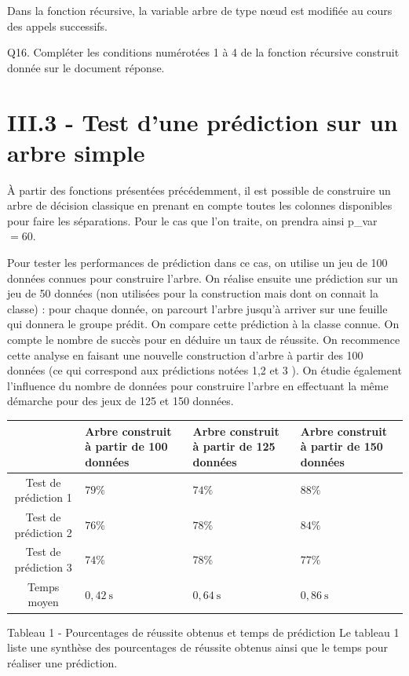 \documentclass[10pt]{article}
\begin{document}
Dans la fonction récursive, la variable arbre de type nœud est modifiée au cours des appels successifs.

Q16. Compléter les conditions numérotées 1 à 4 de la fonction récursive construit donnée sur le document réponse.

\section{III.3 - Test d'une prédiction sur un arbre simple}
À partir des fonctions présentées précédemment, il est possible de construire un arbre de décision classique en prenant en compte toutes les colonnes disponibles pour faire les séparations. Pour le cas que l'on traite, on prendra ainsi p\_var $=60$.

Pour tester les performances de prédiction dans ce cas, on utilise un jeu de 100 données connues pour construire l'arbre. On réalise ensuite une prédiction sur un jeu de 50 données (non utilisées pour la construction mais dont on connait la classe) : pour chaque donnée, on parcourt l'arbre jusqu'à arriver sur une feuille qui donnera le groupe prédit. On compare cette prédiction à la classe connue. On compte le nombre de succès pour en déduire un taux de réussite. On recommence cette analyse en faisant une nouvelle construction d'arbre à partir des 100 données (ce qui correspond aux prédictions notées 1,2 et 3 ). On étudie également l'influence du nombre de données pour construire l'arbre en effectuant la même démarche pour des jeux de 125 et 150 données.

\begin{tabular}{|c|l|l|l|}
\hline
 & Arbre construit à partir de 100 données & Arbre construit à partir de 125 données & Arbre construit à partir de 150 données \\
\hline
Test de prédiction 1 & $79 \%$ & $74 \%$ & $88 \%$ \\
\hline
Test de prédiction 2 & $76 \%$ & $78 \%$ & $84 \%$ \\
\hline
Test de prédiction 3 & $74 \%$ & $78 \%$ & $77 \%$ \\
\hline
Temps moyen & $0,42 \mathrm{~s}$ & $0,64 \mathrm{~s}$ & $0,86 \mathrm{~s}$ \\
\hline
\end{tabular}

Tableau 1 - Pourcentages de réussite obtenus et temps de prédiction Le tableau 1 liste une synthèse des pourcentages de réussite obtenus ainsi que le temps pour réaliser une prédiction.
\end{document}
